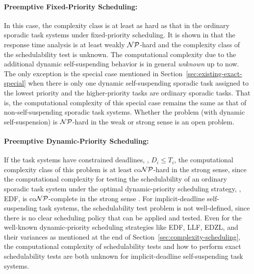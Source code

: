 \paragraph{Preemptive Fixed-Priority Scheduling:}   
In this case, the complexity class is at least as hard as that in the ordinary sporadic task systems under fixed-priority scheduling. It is shown in \cite{EisenbrandR08} that the response time analysis is at least weakly ${\cal NP}$-hard and the complexity class of the schedulability test is unknown. 
The computational complexity due to the additional dynamic self-suspending behavior is in general \emph{unknown} up to now.  The only exception is the special case mentioned in Section~\ref{sec:existing-exact-special} when there is only one dynamic self-suspending sporadic task assigned to the lowest priority and the higher-priority tasks are ordinary sporadic tasks. That is, the computational complexity of this special case remains the same as that of non-self-suspending sporadic task systems. Whether the problem (with dynamic self-suspension) is ${\cal NP}$-hard in the weak or strong sense is an open problem.

\paragraph{Preemptive Dynamic-Priority Scheduling:} 
If the task systems have constrained deadlines, \ie, $D_i \leq T_i$, the computational complexity class of this problem is at least co${\cal NP}$-hard in the strong sense, since the computational complexity for testing the schedulability of an ordinary sporadic task system under the optimal dynamic-priority scheduling strategy, \ie, EDF, is co${\cal NP}$-complete in the strong sense \cite{DBLP:conf/ecrts/Ekberg015}. For implicit-deadline self-suspending task systems, the schedulability test problem is not well-defined, since there is no clear scheduling policy that can be applied and tested.  Even for the well-known dynamic-priority scheduling strategies like EDF, LLF, EDZL, and their variances as mentioned at the end of Section~\ref{sec:complexity-scheduling},  the computational complexity of schedulability tests and how to perform exact schedulability tests are both unknown for implicit-deadline self-suspending task systems.





  
